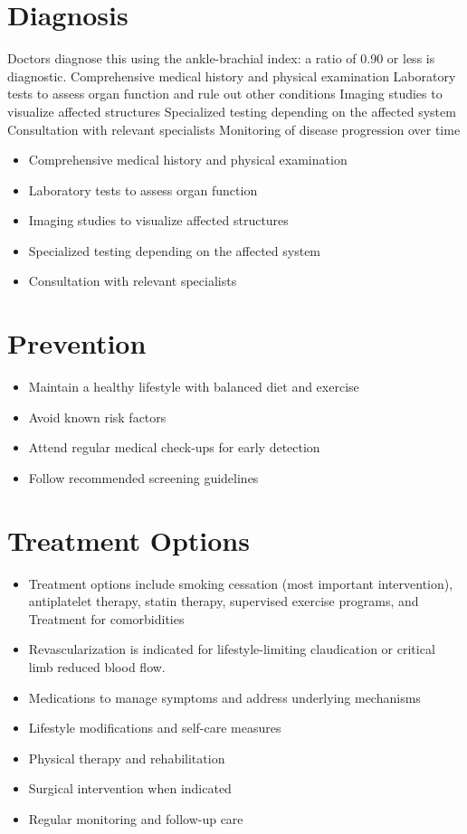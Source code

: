 \section{Diagnosis}
Doctors diagnose this using the ankle-brachial index: a ratio of 0.90 or less is diagnostic. Comprehensive medical history and physical examination Laboratory tests to assess organ function and rule out other conditions Imaging studies to visualize affected structures Specialized testing depending on the affected system Consultation with relevant specialists Monitoring of disease progression over time

\begin{itemize}[noitemsep]
  \item Comprehensive medical history and physical examination
  \item Laboratory tests to assess organ function
  \item Imaging studies to visualize affected structures
  \item Specialized testing depending on the affected system
  \item Consultation with relevant specialists
\end{itemize}
\section{Prevention}
\begin{itemize}[noitemsep]
  \item Maintain a healthy lifestyle with balanced diet and exercise
  \item Avoid known risk factors
  \item Attend regular medical check-ups for early detection
  \item Follow recommended screening guidelines
\end{itemize}
\section{Treatment Options}
\begin{itemize}[noitemsep]
  \item Treatment options include smoking cessation (most important intervention), antiplatelet therapy, statin therapy, supervised exercise programs, and Treatment for comorbidities
  \item Revascularization is indicated for lifestyle-limiting claudication or critical limb reduced blood flow.
  \item Medications to manage symptoms and address underlying mechanisms
  \item Lifestyle modifications and self-care measures
  \item Physical therapy and rehabilitation
  \item Surgical intervention when indicated
  \item Regular monitoring and follow-up care
\end{itemize}
